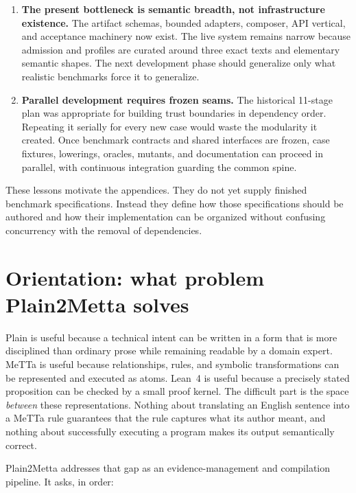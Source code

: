 \documentclass[11pt]{article}
\begin{document}
\begin{enumerate}
\item \textbf{The present bottleneck is semantic breadth, not infrastructure
existence.}  The artifact schemas, bounded adapters, composer, API vertical,
and acceptance machinery now exist.  The live system remains narrow because
admission and profiles are curated around three exact texts and elementary
semantic shapes.  The next development phase should generalize only what
realistic benchmarks force it to generalize.

\item \textbf{Parallel development requires frozen seams.}  The historical
11-stage plan was appropriate for building trust boundaries in dependency
order.  Repeating it serially for every new case would waste the modularity it
created.  Once benchmark contracts and shared interfaces are frozen, case
fixtures, lowerings, oracles, mutants, and documentation can proceed in
parallel, with continuous integration guarding the common spine.
\end{enumerate}

These lessons motivate the appendices.  They do not yet supply finished
benchmark specifications.  Instead they define how those specifications
should be authored and how their implementation can be organized without
confusing concurrency with the removal of dependencies.

\section{Orientation: what problem Plain2Metta solves}

Plain is useful because a technical intent can be written in a form that is
more disciplined than ordinary prose while remaining readable by a domain
expert.  MeTTa is useful because relationships, rules, and symbolic
transformations can be represented and executed as atoms.  Lean~4 is useful
because a precisely stated proposition can be checked by a small proof
kernel.  The difficult part is the space \emph{between} these representations.
Nothing about translating an English sentence into a MeTTa rule guarantees
that the rule captures what its author meant, and nothing about successfully
executing a program makes its output semantically correct.

Plain2Metta addresses that gap as an evidence-management and compilation
pipeline.  It asks, in order:
\end{document}
